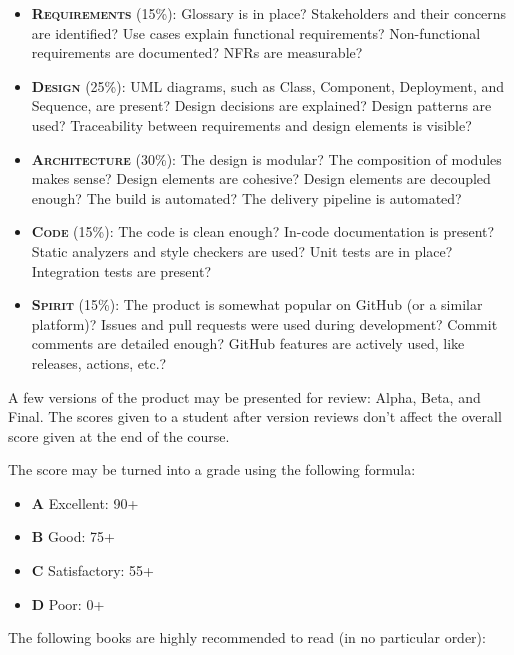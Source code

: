 \documentclass[nobrand,anonymous,nodate,nosecurity]{huawei}
\begin{document}
\begin{itemize}
\item {\bfseries\scshape Requirements} (15\%):
  Glossary is in place?
  Stakeholders and their concerns are identified?
  Use cases explain functional requirements?
  Non-functional requirements are documented?
  NFRs are measurable?
\item {\bfseries\scshape Design} (25\%):
  UML diagrams, such as Class, Component, Deployment, and Sequence, are present?
  Design decisions are explained?
  Design patterns are used?
  Traceability between requirements and design elements is visible?
\item {\bfseries\scshape Architecture} (30\%):
  The design is modular?
  The composition of modules makes sense?
  Design elements are cohesive?
  Design elements are decoupled enough?
  The build is automated?
  The delivery pipeline is automated?
\item {\bfseries\scshape Code} (15\%):
  The code is clean enough?
  In-code documentation is present?
  Static analyzers and style checkers are used?
  Unit tests are in place?
  Integration tests are present?
\item {\bfseries\scshape Spirit} (15\%):
  The product is somewhat popular on GitHub (or a similar platform)?
  Issues and pull requests were used during development?
  Commit comments are detailed enough?
  GitHub features are actively used, like releases, actions, etc.?
\end{itemize}

A few versions of the product may be presented for review:
Alpha, Beta, and Final. The scores given to a student
after version reviews don't affect the overall
score given at the end of the course.

The score may be turned into a grade using the following formula:

\begin{itemize}
\item \textbf{A} Excellent: 90+
\item \textbf{B} Good: 75+
\item \textbf{C} Satisfactory: 55+
\item \textbf{D} Poor: 0+
\end{itemize}

The following books are highly recommended to read (in no particular order):
\end{document}
